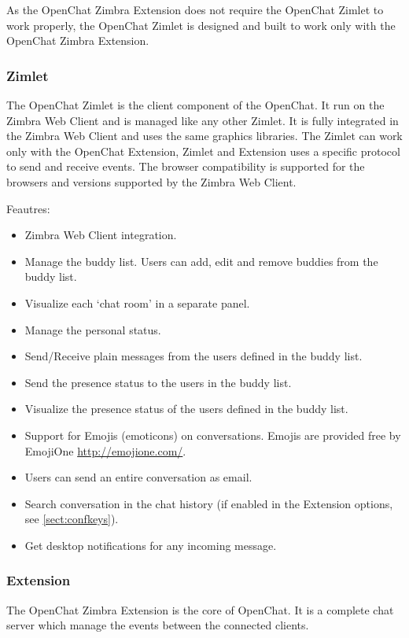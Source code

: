     As the OpenChat Zimbra Extension does not require the OpenChat Zimlet to work properly, the OpenChat Zimlet is designed
    and built to work only with the OpenChat Zimbra Extension.

\subsubsection{Zimlet}
    The OpenChat Zimlet is the client component of the OpenChat. It run on the Zimbra Web Client and is managed like any
    other Zimlet.
    It is fully integrated in the Zimbra Web Client and uses the same graphics libraries.
    The Zimlet can work only with the OpenChat Extension, Zimlet and Extension uses a specific protocol to send and receive
    events.
    The browser compatibility is supported for the browsers and versions supported by the Zimbra Web Client.

    Feautres:
    \begin{itemize}
        \item Zimbra Web Client integration.
        \item Manage the buddy list. Users can add, edit and remove buddies from the buddy list.
        \item Visualize each `chat room' in a separate panel.
        \item Manage the personal status.
        \item Send/Receive plain messages from the users defined in the buddy list.
        \item Send the presence status to the users in the buddy list.
        \item Visualize the presence status of the users defined in the buddy list.
        \item Support for Emojis (emoticons) on conversations. Emojis are provided free by EmojiOne \url{http://emojione.com/}.
        \item Users can send an entire conversation as email.
        \item Search conversation in the chat history (if enabled in the Extension options, see \autoref{sect:confkeys}).
        \item Get desktop notifications for any incoming message.
    \end{itemize}

\subsubsection{Extension}
    The OpenChat Zimbra Extension is the core of OpenChat. It is a complete chat server which manage the events between
    the connected clients.

